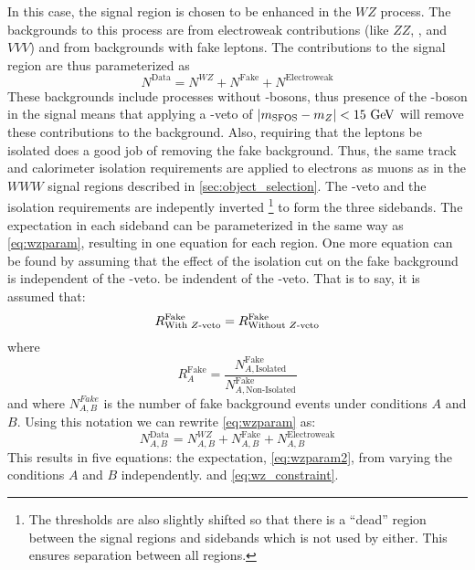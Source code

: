 In this case, the signal region is chosen to be enhanced in the $WZ$ process.
The backgrounds to this process are from electroweak contributions (like
$ZZ$, \ttV, and $VVV$) and from backgrounds with fake leptons.
The contributions to the signal region are thus parameterized as
\begin{equation}
\label{eq:wzparam}
N^{\textrm{Data}} =  N^{WZ} + N^{\textrm{Fake}} + N^{\textrm{Electroweak}}
\end{equation}
These backgrounds include processes without \z-bosons, 
thus presence of the \z-boson in the signal means that applying a \z-veto of 
$|m_{\textrm{SFOS}}-m_{\z}|<15\GeV$
will remove these contributions to the background.
Also, requiring that the leptons be isolated does a good job of 
removing the fake background.
Thus, the same track and calorimeter isolation requirements
are applied to electrons as muons as in the $WWW$ signal regions
described in \sec\ref{sec:object_selection}.
The \z-veto and the isolation requirements are indepently inverted
\footnote{The thresholds are also slightly shifted so that there 
is a ``dead'' region between the signal regions and sidebands 
which is not used by either. This ensures separation
between all regions.}
to form the three sidebands.
The expectation in each sideband can be parameterized
in the same way as \eqn\eqref{eq:wzparam}, resulting in one
equation for each region.
One more equation can be found by assuming that the effect of 
the isolation cut on the fake background is independent of the \z-veto.
be indendent of the \z-veto.
That is to say, it is assumed that:
\begin{equation}
\label{eq:wz_constraint}
R^{\textrm{Fake}}_{\textrm{With \ensuremath{Z}-veto}} = R^{\textrm{Fake}}_{\textrm{Without \ensuremath{Z}-veto}}
\end{equation}
where 
\begin{equation}
R^{\textrm{Fake}}_{A} = 
\frac{N^{\textrm{Fake}}_{A,\textrm{Isolated}}}
{N^{\textrm{Fake}}_{A,\textrm{Non-Isolated}}}
\end{equation}
and where $N^{Fake}_{A,B}$ is the number of fake background
events under conditions $A$ and $B$.
Using this notation we can rewrite \eqn\eqref{eq:wzparam} as:
\begin{equation}
\label{eq:wzparam2}
N^{\textrm{Data}}_{A,B} =  N^{WZ}_{A,B} + N^{\textrm{Fake}}_{A,B} + N^{\textrm{Electroweak}}_{A,B}
\end{equation}
This results in five equations: the expectation,
\eqn\eqref{eq:wzparam2}, from varying the conditions $A$ and $B$ independently.
and \eqn\eqref{eq:wz_constraint}.

